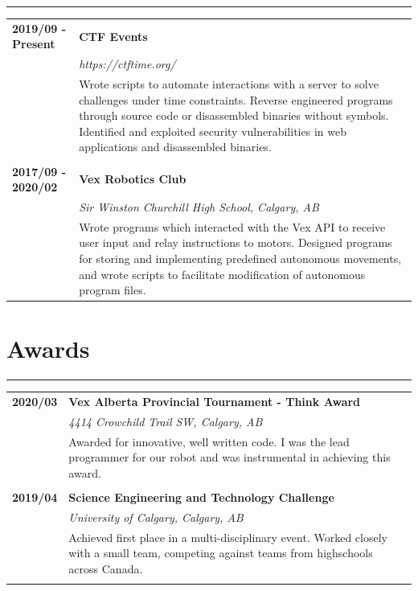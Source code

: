 \documentclass[letterpaper]{article}
\newcommand{\horizontalLine}{%
    \rule{\textwidth}{0.2pt}
    \vspace{1ex}
}
\begin{document}
        \horizontalLine

        \begin{tabular}{p{} p{}} 
            \textbf{2019/09 - Present} & \large\textbf{CTF Events} \\
            & \emph{https://ctftime.org/} \\
            & Wrote scripts to automate interactions with a server to solve challenges under time constraints.
            Reverse engineered programs through source code or disassembled binaries without symbols.
            Identified and exploited security vulnerabilities in web applications and disassembled binaries. \\
            \\
            \textbf{2017/09 - 2020/02} & \large\textbf{Vex Robotics Club} \\
            & \emph{Sir Winston Churchill High School, Calgary, AB} \\
            & Wrote programs which interacted with the Vex API to receive user input and relay instructions to motors.
            Designed programs for storing and implementing predefined autonomous movements, and wrote scripts to facilitate modification of autonomous program files. \\
        \end{tabular}

    \section*{Awards}

        \horizontalLine

        \begin{tabular}{p{} p{}} 
            \textbf{2020/03} & \large\textbf{Vex Alberta Provincial Tournament - Think Award} \\
            & \emph{4414 Crowchild Trail SW, Calgary, AB} \\
            & Awarded for innovative, well written code.
            I was the lead programmer for our robot and was instrumental in achieving this award. \\
            \\
            \textbf{2019/04} & \large\textbf{Science Engineering and Technology Challenge} \\
            & \emph{University of Calgary, Calgary, AB} \\
            & Achieved first place in a multi-disciplinary event.
            Worked closely with a small team, competing against teams from highschools across Canada. \\
            \\
        \end{tabular}
\end{document}
